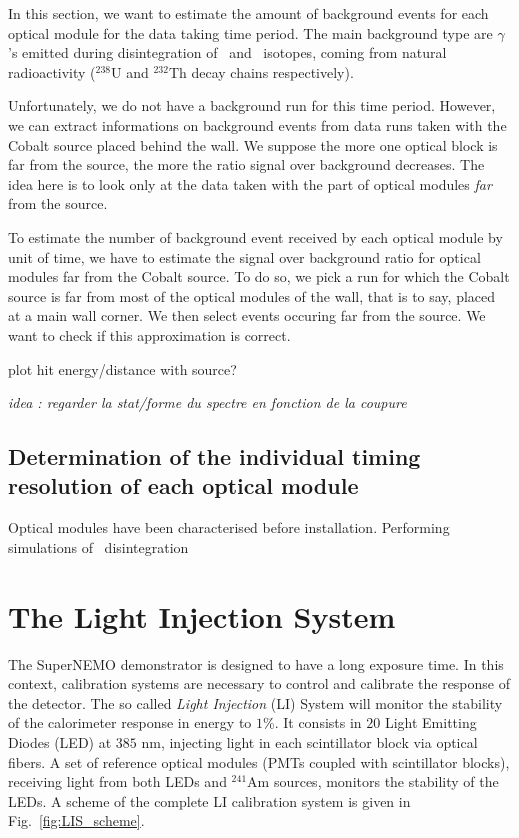 In this section, we want to estimate the amount of background events for each optical module for the data taking time period.
The main background type are $\gamma$'s emitted during disintegration of \Tl\ and \Bi\ isotopes, coming from natural radioactivity ($^{238}$U and $^{232}$Th decay chains respectively).

Unfortunately, we do not have a background run for this time period.
However, we can extract informations on background events from data runs taken with the Cobalt source placed behind the wall.
We suppose the more one optical block is far from the source, the more the ratio signal over background decreases.
The idea here is to look only at the data taken with the part of optical modules \emph{far} from the source.


To estimate the number of background event received by each optical module by unit of time, we have to estimate the signal over background ratio for optical modules far from the Cobalt source.
To do so, we pick a run for which the Cobalt source is far from most of the optical modules of the wall, that is to say, placed at a main wall corner.
We then select events occuring far from the source.
We want to check if this approximation is correct.

plot hit energy/distance with source?

\emph{idea : regarder la stat/forme du spectre en fonction de la coupure}


\subsection{Determination of the individual timing resolution of each optical module}

Optical modules have been characterised before installation.
Performing simulations of \Co\ disintegration





\section{The Light Injection System}
\label{sec:LIS}

The SuperNEMO demonstrator is designed to have a long exposure time.
In this context, calibration systems are necessary to control and calibrate the response of the detector.
The so called \emph{Light Injection} (LI) System will monitor the stability of the calorimeter response in energy to $1$\%.
It consists in $20$ Light Emitting Diodes (LED) at $385$ nm, injecting light in each scintillator block via optical fibers.
A set of reference optical modules (PMTs coupled with scintillator blocks), receiving light from both LEDs and $^{241}$Am sources, monitors the stability of the LEDs.
A scheme of the complete LI calibration system is given in Fig.~\ref{fig:LIS_scheme}.

